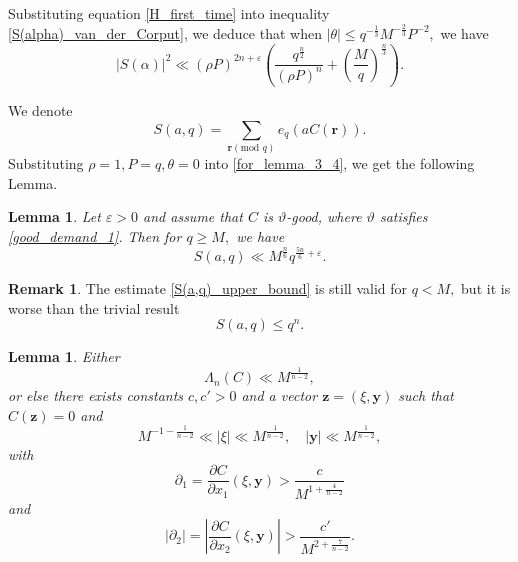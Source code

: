 \documentclass[12pt]{amsart}
\newtheorem{lemma}[theorem]{Lemma}
\theoremstyle{definition}
\newtheorem{remark}[theorem]{Remark}
\newtheorem*{xrem}{Remark}
\numberwithin{equation}{section}
\begin{document}
Substituting equation \eqref{H_first_time} into inequality \eqref{S(alpha)_van_der_Corput}, we deduce that when $|\theta| \leq q^{-\frac{1}{3}}M^{-\frac{2}{3}}P^{-2},$ we have
\begin{equation}
    \label{for_lemma_3_4}
    \left|S(\alpha)\right|^2 \ll (\rho P)^{2n+\varepsilon}\left(\frac{q^{\frac{n}{2}}}{(\rho P)^{n}}+\left(\frac{M}{q}\right)^{\frac{n}{3}}\right).
\end{equation}

We denote
\begin{equation}
    \label{S(a,q)_definition}
    S(a,q)=\sum_{\boldsymbol{r}(\text{mod }q)} e_q(aC(\boldsymbol{r})).
\end{equation}
Substituting $\rho=1, P=q, \theta=0$  into \eqref{for_lemma_3_4}, we get the following Lemma.

\begin{lemma}
    \label{lemma_S(a,q)_upper_bound}
 Let $\varepsilon >0$ and assume that $C$ is $\vartheta$-good, where $\vartheta$ satisfies \eqref{good_demand_1}. Then for $q \geq M,$ we have
    \begin{equation}
    \label{S(a,q)_upper_bound}
    S(a,q) \ll M^{\frac{n}{6}}q^{\frac{5n}{6}+\varepsilon}.
\end{equation}
\end{lemma}

\begin{xrem}
    The estimate \eqref{S(a,q)_upper_bound} is still valid for $q<M,$ but it is worse than the trivial result 
    $$S(a,q) \leq q^n.$$
\end{xrem}

\begin{lemma}
    \label{choice}
    Either
    \begin{equation}
        \Lambda_{n}(C) \ll M^{\frac{1}{n-2}},
    \end{equation}
    or else there exists constants $c,c' > 0$ and a vector $\mathbf{z}=(\xi, \mathbf{y})$ such that $C(\mathbf{z})=0$ and
    \begin{equation}
        M^{-1-\frac{1}{n-2}} \ll |\xi| \ll M^{\frac{1}{n-2}},\quad |\mathbf{y}| \ll M^{\frac{1}{n-2}},
    \end{equation}
    with
    \begin{equation}
        \partial_1=\frac{\partial C}{\partial x_1}(\xi, \boldsymbol{y}) > \frac{c}{M^{1+\frac{4}{n-2}}}
    \end{equation}
    and
    \begin{equation}
        |\partial_2|=\left|\frac{\partial C}{\partial x_2}(\xi, \boldsymbol{y})\right| > \frac{c'}{M^{2+\frac{7}{n-2}}}.
    \end{equation}
\end{lemma}
\end{document}
